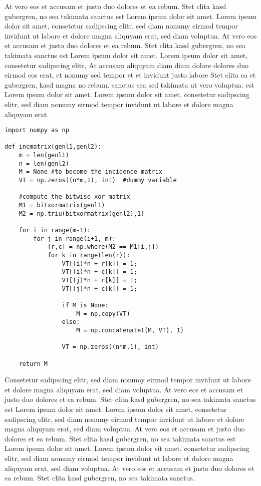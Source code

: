 \documentclass[ %
	DIV=15,
	BCOR=14mm, %
	parskip=half, %
	headsepline, %
	cleardoublepage=empty, %
	tablecaptionabove, %
	toc=bib, %
	toc=listofnumbered, %
	listof=leveldown, %
	numbers=noendperiod %
	]{scrbook}
\begin{document}
At vero eos et accusam et justo duo dolores et ea rebum. Stet clita kasd gubergren, no sea takimata sanctus est Lorem ipsum dolor sit amet. Lorem ipsum dolor sit amet, consetetur sadipscing elitr, sed diam nonumy eirmod tempor invidunt ut labore et dolore magna aliquyam erat, sed diam voluptua. At vero eos et accusam et justo duo dolores et ea rebum. Stet clita kasd gubergren, no sea takimata sanctus est Lorem ipsum dolor sit amet. Lorem ipsum dolor sit amet, consetetur sadipscing elitr, At accusam aliquyam diam diam dolore dolores duo eirmod eos erat, et nonumy sed tempor et et invidunt justo labore Stet clita ea et gubergren, kasd magna no rebum. sanctus sea sed takimata ut vero voluptua. est Lorem ipsum dolor sit amet. Lorem ipsum dolor sit amet, consetetur sadipscing elitr, sed diam nonumy eirmod tempor invidunt ut labore et dolore magna aliquyam erat.

\begin{verbatim}
import numpy as np
 
def incmatrix(genl1,genl2):
    m = len(genl1)
    n = len(genl2)
    M = None #to become the incidence matrix
    VT = np.zeros((n*m,1), int)  #dummy variable
 
    #compute the bitwise xor matrix
    M1 = bitxormatrix(genl1)
    M2 = np.triu(bitxormatrix(genl2),1) 
 
    for i in range(m-1):
        for j in range(i+1, m):
            [r,c] = np.where(M2 == M1[i,j])
            for k in range(len(r)):
                VT[(i)*n + r[k]] = 1;
                VT[(i)*n + c[k]] = 1;
                VT[(j)*n + r[k]] = 1;
                VT[(j)*n + c[k]] = 1;
 
                if M is None:
                    M = np.copy(VT)
                else:
                    M = np.concatenate((M, VT), 1)
 
                VT = np.zeros((n*m,1), int)
 
    return M
\end{verbatim}

Consetetur sadipscing elitr, sed diam nonumy eirmod tempor invidunt ut labore et dolore magna aliquyam erat, sed diam voluptua. At vero eos et accusam et justo duo dolores et ea rebum. Stet clita kasd gubergren, no sea takimata sanctus est Lorem ipsum dolor sit amet. Lorem ipsum dolor sit amet, consetetur sadipscing elitr, sed diam nonumy eirmod tempor invidunt ut labore et dolore magna aliquyam erat, sed diam voluptua. At vero eos et accusam et justo duo dolores et ea rebum. Stet clita kasd gubergren, no sea takimata sanctus est Lorem ipsum dolor sit amet. Lorem ipsum dolor sit amet, consetetur sadipscing elitr, sed diam nonumy eirmod tempor invidunt ut labore et dolore magna aliquyam erat, sed diam voluptua. At vero eos et accusam et justo duo dolores et ea rebum. Stet clita kasd gubergren, no sea takimata sanctus.
\end{document}
